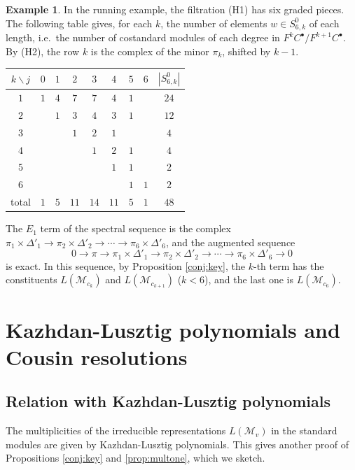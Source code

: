 \documentclass[a4paper,12pt,leqno]{amsart}
\newcommand{\caM}{\mathcal{M}}
\theoremstyle{plain}
\theoremstyle{definition}
\theoremstyle{definition}
\newtheorem{example}[thm]{Example}
\begin{document}
\begin{example}\label{ex:run5} In the running example, the filtration (H1) has six graded pieces.
The following table gives, for each $k$, the number of elements $w\in S^0_{6,k}$ of each length,
i.e.\ the number of costandard modules of each degree in $F^kC^\bullet/F^{k+1}C^\bullet$. By
(H2), the row $k$ is the complex of the minor $\pi_k$, shifted by $k-1$.
\begin{center}
\begin{tabular}{c|ccccccc|c}
$k\backslash j$ & $0$ & $1$ & $2$ & $3$ & $4$ & $5$ & $6$ & $|S^0_{6,k}|$\\\hline
$1$ & $1$ & $4$ & $7$ & $7$ & $4$ & $1$ & & $24$\\
$2$ & & $1$ & $3$ & $4$ & $3$ & $1$ & & $12$\\
$3$ & & & $1$ & $2$ & $1$ & & & $4$\\
$4$ & & & & $1$ & $2$ & $1$ & & $4$\\
$5$ & & & & & $1$ & $1$ & & $2$\\
$6$ & & & & & & $1$ & $1$ & $2$\\\hline
total & $1$ & $5$ & $11$ & $14$ & $11$ & $5$ & $1$ & $48$
\end{tabular}
\end{center}
The $E_1$ term of the spectral sequence is the complex
$\pi_1\times\Delta'_1\rightarrow\pi_2\times\Delta'_2\rightarrow\cdots\rightarrow\pi_6\times\Delta'_6$,
and the augmented sequence
\[0\rightarrow\pi\rightarrow\pi_1\times\Delta'_1\rightarrow\pi_2\times\Delta'_2\rightarrow\cdots
\rightarrow\pi_6\times\Delta'_6\rightarrow0\]
is exact. In this sequence, by Proposition \ref{conj:key}, the $k$-th term has the constituents $L(\caM_{c_k})$ and
$L(\caM_{c_{k+1}})$ ($k<6$), and the last one is $L(\caM_{c_6})$.
\end{example}



\section{Kazhdan-Lusztig polynomials and Cousin resolutions}\label{sec:KL}

\subsection{Relation with Kazhdan-Lusztig polynomials}\label{ssec:KL}
The multiplicities of the irreducible representations $L(\caM_v)$ in the standard modules are given
by Kazhdan-Lusztig polynomials. This gives another proof of Propositions \ref{conj:key} and
\ref{prop:multone}, which we sketch.
\end{document}
